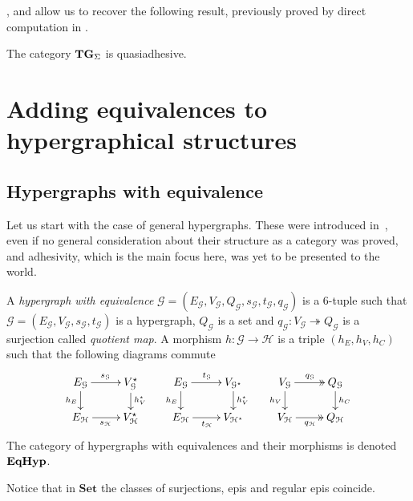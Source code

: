 \documentclass[a4paper,UKenglish,cleveref,pdftex,thm-restate,numberwithinsect]{lipics-v2021}
\newcommand{\Set}{\mathbf{Set}}
\newcommand{\catname}[1]{\textbf{\textup{#1}}}
\newcommand{\EqHyp}{\catname{EqHyp}} %
\newcommand{\tg}[0]{\catname{TG}_{\Sigma}}
\newcommand{\eto}{\twoheadrightarrow}
\begin{document}
,  and  allow us to recover the following result, previously proved by direct computation in \cite[Thm.~4.2]{CorradiniG05}.
\begin{corollary}
	The category $\tg$ is quasiadhesive.
\end{corollary}

\section{Adding equivalences to hypergraphical structures}
\label{hypereq}

\subsection{Hypergraphs with equivalence}

Let us start with the case of general hypergraphs. These were introduced in~\cite{concur2006}, even if no general consideration about their structure as a category was proved, and adhesivity, 
which is the main focus here, was yet to be presented to the world.

\begin{definition}
	A \emph{hypergraph with equivalence} $\mathcal{G} = (E_\mathcal{G}, V_{\mathcal{G}}, Q_\mathcal{G}, s_\mathcal{G}, t_\mathcal{G}, q_\mathcal{G})$ is a 6-tuple such that $\mathcal{G} = (E_\mathcal{G}, V_{\mathcal{G}}, s_\mathcal{G}, t_\mathcal{G})$ is a hypergraph, $Q_\mathcal{G}$ is a set and $q_{\mathcal{G}}: V_{\mathcal{G}}\eto Q_{\mathcal{G}}$ is a surjection called \emph{quotient map}. 
	A morphism $h\colon \mathcal{G\to H}$ is a triple $(h_E, h_V, h_C)$ such that the following diagrams commute
	\[\xymatrix@R=15pt{
		{E_\mathcal{G}}\ar[r]^{s_\mathcal{G}}\ar[d]_{h_E} & {V_{\mathcal{G}}^\star}\ar[d]^{h_V^\star} & {E_\mathcal{G}}\ar[r]^{t_\mathcal{G}}\ar[d]_{h_E} & {V_{\mathcal{G}^\star}}\ar[d]^{h_V^\star} & {V_\mathcal{G}}\ar@{>>}[r]^{q_\mathcal{G}}\ar[d]_{h_V} & {Q_{\mathcal{G}}} \ar[d]^{h_C} \\
		{E_\mathcal{H}}\ar[r]_{s_\mathcal{H}} & {V_{\mathcal{H}}^\star}	& {E_\mathcal{H}}\ar[r]_{t_\mathcal{H}} & {V_{\mathcal{H}^\star}}& {V_\mathcal{H}}\ar@{>>}[r]_{q_\mathcal{H}} & {Q_\mathcal{H}}
	}\]
	The category of hypergraphs with equivalences and their morphisms is denoted $\EqHyp$.
	
\end{definition}

\begin{remark}
	Notice that in $\Set$ the classes of surjections, epis and regular epis coincide.
\end{remark}
\end{document}
